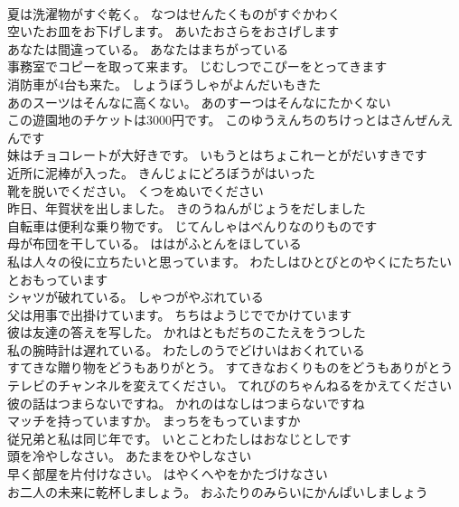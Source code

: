\documentclass[8pt]{extreport}
\begin{document}
\begin{CJK}{UTF8}{min}
\\	夏は洗濯物がすぐ乾く。	なつはせんたくものがすぐかわく 
\\	空いたお皿をお下げします。	あいたおさらをおさげします 
\\	あなたは間違っている。	あなたはまちがっている 
\\	事務室でコピーを取って来ます。	じむしつでこぴーをとってきます 
\\	消防車が4台も来た。	しょうぼうしゃがよんだいもきた 
\\	あのスーツはそんなに高くない。	あのすーつはそんなにたかくない 
\\	この遊園地のチケットは3000円です。	このゆうえんちのちけっとはさんぜんえんです 
\\	妹はチョコレートが大好きです。	いもうとはちょこれーとがだいすきです 
\\	近所に泥棒が入った。	きんじょにどろぼうがはいった 
\\	靴を脱いでください。	くつをぬいでください 
\\	昨日、年賀状を出しました。	きのうねんがじょうをだしました 
\\	自転車は便利な乗り物です。	じてんしゃはべんりなのりものです 
\\	母が布団を干している。	ははがふとんをほしている 
\\	私は人々の役に立ちたいと思っています。	わたしはひとびとのやくにたちたいとおもっています 
\\	シャツが破れている。	しゃつがやぶれている 
\\	父は用事で出掛けています。	ちちはようじででかけています 
\\	彼は友達の答えを写した。	かれはともだちのこたえをうつした 
\\	私の腕時計は遅れている。	わたしのうでどけいはおくれている 
\\	すてきな贈り物をどうもありがとう。	すてきなおくりものをどうもありがとう 
\\	テレビのチャンネルを変えてください。	てれびのちゃんねるをかえてください 
\\	彼の話はつまらないですね。	かれのはなしはつまらないですね 
\\	マッチを持っていますか。	まっちをもっていますか 
\\	従兄弟と私は同じ年です。	いとことわたしはおなじとしです 
\\	頭を冷やしなさい。	あたまをひやしなさい 
\\	早く部屋を片付けなさい。	はやくへやをかたづけなさい 
\\	お二人の未来に乾杯しましょう。	おふたりのみらいにかんぱいしましょう 

\end{CJK}
\end{document}
